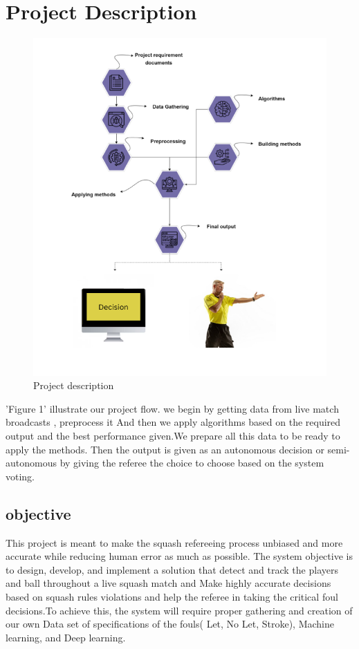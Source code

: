 \documentclass[12pt]{article}
\begin{document}
\section{Project Description}
\begin{figure}[H]
    \centering
    \includegraphics[width=0.75\linewidth]{figures/Project description.png}
    \caption{Project description}
    \label{fig:Project description}
\end{figure}

’Figure 1’ illustrate our project flow. we begin by getting data from live match broadcasts , preprocess it And then we apply algorithms based on the required output and
the best performance given.We prepare all this data to be ready to apply the methods. Then the output is given as an autonomous decision or semi-autonomous by giving the referee the choice to choose based on the system voting.

\subsection{objective}
This project is meant to make the squash refereeing process unbiased and more accurate while reducing human error as much as possible. The system objective is to design, develop, and implement a solution that detect and track the players and ball throughout a live squash match and Make highly accurate decisions based on squash rules violations and help the referee in taking the critical foul decisions.To achieve this, the system will require proper gathering and creation of our own Data set of specifications of the fouls( Let, No Let, Stroke), Machine learning, and Deep learning.
\end{document}

